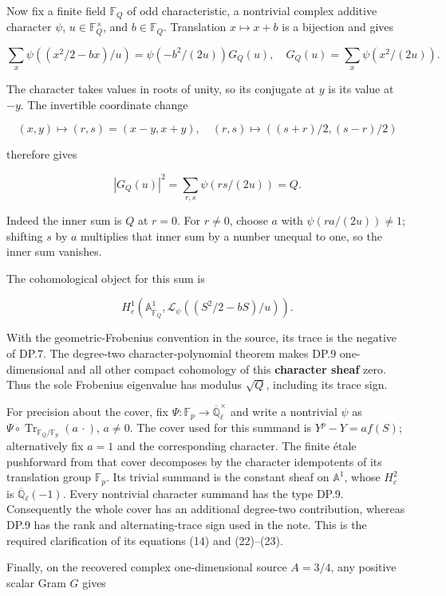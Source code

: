 Now fix a finite field \(\mathbb F_Q\) of odd characteristic, a nontrivial complex additive character \(\psi\), \(u\in\mathbb F_Q^\times\), and \(b\in\mathbb F_Q\). Translation \(x\mapsto x+b\) is a bijection and gives

\[
\sum_x\psi((x^2/2-bx)/u)
=\psi(-b^2/(2u))G_Q(u),
\quad G_Q(u)=\sum_x\psi(x^2/(2u)).
\tag{DP.7}
\]

The character takes values in roots of unity, so its conjugate at \(y\) is its value at \(-y\). The invertible coordinate change

\[
(x,y)\mapsto(r,s)=(x-y,x+y),
\quad (r,s)\mapsto((s+r)/2,(s-r)/2)
\]

therefore gives

\[
|G_Q(u)|^2=\sum_{r,s}\psi(rs/(2u))=Q.
\tag{DP.8}
\]

Indeed the inner sum is \(Q\) at \(r=0\). For \(r\ne0\), choose \(a\) with \(\psi(ra/(2u))\ne1\); shifting \(s\) by \(a\) multiplies that inner sum by a number unequal to one, so the inner sum vanishes.

The cohomological object for this sum is

\[
H_c^1(\mathbb A^1_{\overline{\mathbb F}_Q},
 \mathcal L_{\psi}((S^2/2-bS)/u)).
\tag{DP.9}
\]

With the geometric-Frobenius convention in the source, its trace is the negative of DP.7. The degree-two character-polynomial theorem makes DP.9 one-dimensional and all other compact cohomology of this \textbf{character sheaf} zero. Thus the sole Frobenius eigenvalue has modulus \(\sqrt Q\), including its trace sign.

For precision about the cover, fix \(\Psi:\mathbb F_p\to\overline{\mathbb Q}_{\ell}^{\times}\) and write a nontrivial \(\psi\) as \(\Psi\circ\operatorname{Tr}_{\mathbb F_Q/\mathbb F_p}(a\,\cdot)\), \(a\ne0\). The cover used for this summand is \(Y^p-Y=a f(S)\); alternatively fix \(a=1\) and the corresponding character. The finite étale pushforward from that cover decomposes by the character idempotents of its translation group \(\mathbb F_p\). Its trivial summand is the constant sheaf on \(\mathbb A^1\), whose \(H_c^2\) is \(\overline{\mathbb Q}_{\ell}(-1)\). Every nontrivial character summand has the type DP.9. Consequently the whole cover has an additional degree-two contribution, whereas DP.9 has the rank and alternating-trace sign used in the note. This is the required clarification of its equations (14) and (22)--(23).

Finally, on the recovered complex one-dimensional source \(A=3/4\), any positive scalar Gram \(G\) gives

